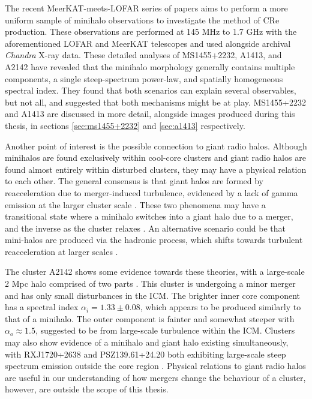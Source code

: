 The recent MeerKAT-meets-LOFAR series of papers \citep{Riseley2022, Riseley2023, Riseley2024} aims to perform a more uniform sample of minihalo observations to investigate the method of CRe production. These observations are performed at 145 MHz to 1.7 GHz with the aforementioned LOFAR and MeerKAT telescopes and used alongside archival \textit{Chandra} X-ray data. These detailed analyses of MS1455+2232, A1413, and A2142 have revealed that the minihalo morphology generally contains multiple components, a single steep-spectrum power-law, and spatially homogeneous spectral index. They found that both scenarios can explain several observables, but not all, and suggested that both mechanisms might be at play. MS1455+2232 and A1413 are discussed in more detail, alongside images produced during this thesis, in sections \ref{sec:ms1455+2232} and \ref{sec:a1413} respectively.

Another point of interest is the possible connection to giant radio halos. Although minihalos are found exclusively within cool-core clusters and giant radio halos are found almost entirely within disturbed clusters, they may have a physical relation to each other. The general consensus is that giant halos are formed by reacceleration due to merger-induced turbulence, evidenced by a lack of gamma emission at the larger cluster scale \citep{Brunetti2012, Brunetti2017}. These two phenomena may have a transitional state where a minihalo switches into a giant halo due to a merger, and the inverse as the cluster relaxes \citep{Brunetti2014}. An alternative scenario could be that mini-halos are produced via the hadronic process, which shifts towards turbulent reacceleration at larger scales \citep{Zandanel2014}. 

The cluster A2142 shows some evidence towards these theories, with a large-scale 2 Mpc halo comprised of two parts \citep{Venturi2017}. This cluster is undergoing a minor merger and has only small disturbances in the ICM. The brighter inner core component has a spectral index $\alpha_i = 1.33\pm0.08$, which appears to be produced similarly to that of a minihalo. The outer component is fainter and somewhat steeper with $\alpha_o \approx 1.5$, suggested to be from large-scale turbulence within the ICM. Clusters may also show evidence of a minihalo and giant halo existing simultaneously, with RXJ1720+2638 and PSZ139.61+24.20 both exhibiting large-scale steep spectrum emission outside the core region \citep{Savini2018a, Savini2019}. Physical relations to giant radio halos are useful in our understanding of how mergers change the behaviour of a cluster, however, are outside the scope of this thesis.


